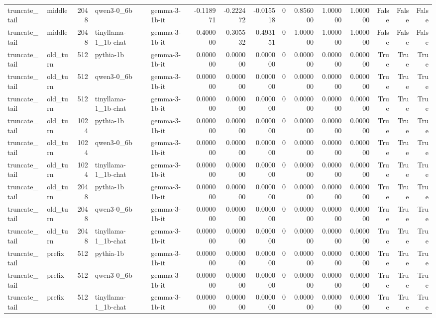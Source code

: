 \begin{tabular}{llrllrrrrrrrrrr}
truncate_tail & middle & 2048 & qwen3-0_6b & gemma-3-1b-it & -0.118971 & -0.222472 & -0.015518 & 0 & 0.856000 & 1.000000 & 1.000000 & False & False & False \\
truncate_tail & middle & 2048 & tinyllama-1_1b-chat & gemma-3-1b-it & 0.400000 & 0.305532 & 0.493151 & 0 & 1.000000 & 1.000000 & 1.000000 & False & False & False \\
truncate_tail & old_turn & 512 & pythia-1b & gemma-3-1b-it & 0.000000 & 0.000000 & 0.000000 & 0 & 0.000000 & 0.000000 & 0.000000 & True & True & True \\
truncate_tail & old_turn & 512 & qwen3-0_6b & gemma-3-1b-it & 0.000000 & 0.000000 & 0.000000 & 0 & 0.000000 & 0.000000 & 0.000000 & True & True & True \\
truncate_tail & old_turn & 512 & tinyllama-1_1b-chat & gemma-3-1b-it & 0.000000 & 0.000000 & 0.000000 & 0 & 0.000000 & 0.000000 & 0.000000 & True & True & True \\
truncate_tail & old_turn & 1024 & pythia-1b & gemma-3-1b-it & 0.000000 & 0.000000 & 0.000000 & 0 & 0.000000 & 0.000000 & 0.000000 & True & True & True \\
truncate_tail & old_turn & 1024 & qwen3-0_6b & gemma-3-1b-it & 0.000000 & 0.000000 & 0.000000 & 0 & 0.000000 & 0.000000 & 0.000000 & True & True & True \\
truncate_tail & old_turn & 1024 & tinyllama-1_1b-chat & gemma-3-1b-it & 0.000000 & 0.000000 & 0.000000 & 0 & 0.000000 & 0.000000 & 0.000000 & True & True & True \\
truncate_tail & old_turn & 2048 & pythia-1b & gemma-3-1b-it & 0.000000 & 0.000000 & 0.000000 & 0 & 0.000000 & 0.000000 & 0.000000 & True & True & True \\
truncate_tail & old_turn & 2048 & qwen3-0_6b & gemma-3-1b-it & 0.000000 & 0.000000 & 0.000000 & 0 & 0.000000 & 0.000000 & 0.000000 & True & True & True \\
truncate_tail & old_turn & 2048 & tinyllama-1_1b-chat & gemma-3-1b-it & 0.000000 & 0.000000 & 0.000000 & 0 & 0.000000 & 0.000000 & 0.000000 & True & True & True \\
truncate_tail & prefix & 512 & pythia-1b & gemma-3-1b-it & 0.000000 & 0.000000 & 0.000000 & 0 & 0.000000 & 0.000000 & 0.000000 & True & True & True \\
truncate_tail & prefix & 512 & qwen3-0_6b & gemma-3-1b-it & 0.000000 & 0.000000 & 0.000000 & 0 & 0.000000 & 0.000000 & 0.000000 & True & True & True \\
truncate_tail & prefix & 512 & tinyllama-1_1b-chat & gemma-3-1b-it & 0.000000 & 0.000000 & 0.000000 & 0 & 0.000000 & 0.000000 & 0.000000 & True & True & True \\

\end{tabular}
